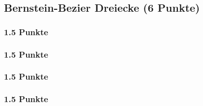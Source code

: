 \newif\ifvimbug
\vimbugfalse

\ifvimbug

\fi


\subsection{Bernstein-Bezier Dreiecke (6 Punkte)}
\subsubsection{1.5 Punkte}
\subsubsection{1.5 Punkte}
\subsubsection{1.5 Punkte}
\subsubsection{1.5 Punkte}
